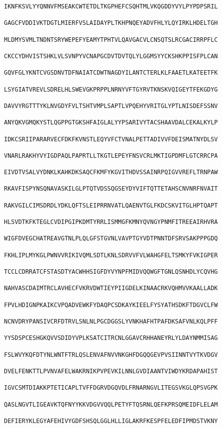 \documentclass[en,black,10pt,normal]{elegantnote}
\begin{document}
\begin{lstlisting}[frame=single]
IKNFKSVLYYQNNVFMSEAKCWTETDLTKGPHEFCSQHTMLVKQGDDYVYLPYPDPSRIL

GAGCFVDDIVKTDGTLMIERFVSLAIDAYPLTKHPNQEYADVFHLYLQYIRKLHDELTGH

MLDMYSVMLTNDNTSRYWEPEFYEAMYTPHTVLQAVGACVLCNSQTSLRCGACIRRPFLC

CKCCYDHVISTSHKLVLSVNPYVCNAPGCDVTDVTQLYLGGMSYYCKSHKPPISFPLCAN

GQVFGLYKNTCVGSDNVTDFNAIATCDWTNAGDYILANTCTERLKLFAAETLKATEETFK

LSYGIATVREVLSDRELHLSWEVGKPRPPLNRNYVFTGYRVTKNSKVQIGEYTFEKGDYG

DAVVYRGTTTYKLNVGDYFVLTSHTVMPLSAPTLVPQEHYVRITGLYPTLNISDEFSSNV

ANYQKVGMQKYSTLQGPPGTGKSHFAIGLALYYPSARIVYTACSHAAVDALCEKALKYLP

IDKCSRIIPARARVECFDKFKVNSTLEQYVFCTVNALPETTADIVVFDEISMATNYDLSV

VNARLRAKHYVYIGDPAQLPAPRTLLTKGTLEPEYFNSVCRLMKTIGPDMFLGTCRRCPA

EIVDTVSALVYDNKLKAHKDKSAQCFKMFYKGVITHDVSSAINRPQIGVVREFLTRNPAW

RKAVFISPYNSQNAVASKILGLPTQTVDSSQGSEYDYVIFTQTTETAHSCNVNRFNVAIT

RAKVGILCIMSDRDLYDKLQFTSLEIPRRNVATLQAENVTGLFKDCSKVITGLHPTQAPT

HLSVDTKFKTEGLCVDIPGIPKDMTYRRLISMMGFKMNYQVNGYPNMFITREEAIRHVRA

WIGFDVEGCHATREAVGTNLPLQLGFSTGVNLVAVPTGYVDTPNNTDFSRVSAKPPPGDQ

FKHLIPLMYKGLPWNVVRIKIVQMLSDTLKNLSDRVVFVLWAHGFELTSMKYFVKIGPER

TCCLCDRRATCFSTASDTYACWHHSIGFDYVYNPFMIDVQQWGFTGNLQSNHDLYCQVHG

NAHVASCDAIMTRCLAVHECFVKRVDWTIEYPIIGDELKINAACRKVQHMVVKAALLADK

FPVLHDIGNPKAIKCVPQADVEWKFYDAQPCSDKAYKIEELFYSYATHSDKFTDGVCLFW

NCNVDRYPANSIVCRFDTRVLSNLNLPGCDGGSLYVNKHAFHTPAFDKSAFVNLKQLPFF

YYSDSPCESHGKQVVSDIDYVPLKSATCITRCNLGGAVCRHHANEYRLYLDAYNMMISAG

FSLWVYKQFDTYNLWNTFTRLQSLENVAFNVVNKGHFDGQQGEVPVSIINNTVYTKVDGV

DVELFENKTTLPVNVAFELWAKRNIKPVPEVKILNNLGVDIAANTVIWDYKRDAPAHIST

IGVCSMTDIAKKPTETICAPLTVFFDGRVDGQVDLFRNARNGVLITEGSVKGLQPSVGPK

QASLNGVTLIGEAVKTQFNYYKKVDGVVQQLPETYFTQSRNLQEFKPRSQMEIDFLELAM

DEFIERYKLEGYAFEHIVYGDFSHSQLGGLHLLIGLAKRFKESPFELEDFIPMDSTVKNY


\end{lstlisting}
\end{document}
